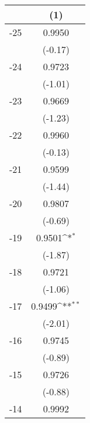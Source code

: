 {
\def\sym#1{\ifmmode^{#1}\else\(^{#1}\)\fi}
\begin{tabular}{l*{1}{c}}
\hline\hline
                                   &\multicolumn{1}{c}{(1)}         \\
\hline
  -25                              &      0.9950         \\
                                   &     (-0.17)         \\
[1em]
  -24                              &      0.9723         \\
                                   &     (-1.01)         \\
[1em]
  -23                              &      0.9669         \\
                                   &     (-1.23)         \\
[1em]
  -22                              &      0.9960         \\
                                   &     (-0.13)         \\
[1em]
  -21                              &      0.9599         \\
                                   &     (-1.44)         \\
[1em]
  -20                              &      0.9807         \\
                                   &     (-0.69)         \\
[1em]
  -19                              &      0.9501\sym{*}  \\
                                   &     (-1.87)         \\
[1em]
  -18                              &      0.9721         \\
                                   &     (-1.06)         \\
[1em]
  -17                              &      0.9499\sym{**} \\
                                   &     (-2.01)         \\
[1em]
  -16                              &      0.9745         \\
                                   &     (-0.89)         \\
[1em]
  -15                              &      0.9726         \\
                                   &     (-0.88)         \\
[1em]
  -14                              &      0.9992         \\

\end{tabular}}
